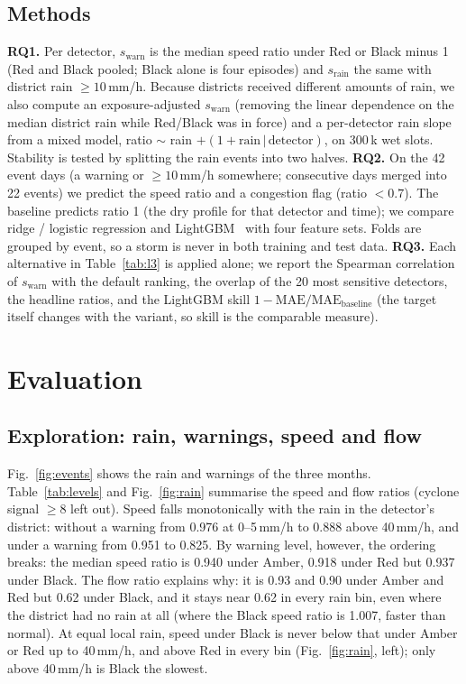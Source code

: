 \documentclass[conference]{IEEEtran}
\begin{document}
\subsection{Methods}
\textbf{RQ1.} Per detector, $s_{\mathrm{warn}}$ is the median speed ratio under Red or Black
minus 1 (Red and Black pooled; Black alone is four episodes) and $s_{\mathrm{rain}}$ the same
with district rain $\geq 10$\,mm/h. Because districts received different amounts of rain,
we also compute an exposure-adjusted $s_{\mathrm{warn}}$ (removing the linear dependence on
the median district rain while Red/Black was in force) and a per-detector rain slope from a
mixed model, ratio $\sim$ rain $+ (1+\mathrm{rain}\,|\,\mathrm{detector})$, on 300\,k wet
slots. Stability is tested by splitting the rain events into two halves.
\textbf{RQ2.} On the 42 event days (a warning or $\geq 10$\,mm/h somewhere; consecutive days
merged into 22 events) we predict the speed ratio and a congestion flag (ratio $<0.7$). The
baseline predicts ratio 1 (the dry profile for that detector and time); we compare ridge /
logistic regression and LightGBM~\cite{ke2017lightgbm} with four feature sets. Folds are
grouped by event, so a storm is never in both training and test data. \textbf{RQ3.} Each
alternative in Table~\ref{tab:l3} is applied alone; we report the Spearman correlation of
$s_{\mathrm{warn}}$ with the default ranking, the overlap of the 20 most sensitive detectors,
the headline ratios, and the LightGBM skill $1-\mathrm{MAE}/\mathrm{MAE}_{\mathrm{baseline}}$
(the target itself changes with the variant, so skill is the comparable measure).

\section{Evaluation}
\subsection{Exploration: rain, warnings, speed and flow}
Fig.~\ref{fig:events} shows the rain and warnings of the three months. Table~\ref{tab:levels}
and Fig.~\ref{fig:rain} summarise the speed and flow ratios (cyclone signal $\geq 8$ left
out). Speed falls monotonically with the rain in the detector's district: without a warning
from 0.976 at 0--5\,mm/h to 0.888 above 40\,mm/h, and under a warning from 0.951 to 0.825.
By warning level, however, the ordering breaks: the median speed ratio is 0.940 under Amber,
0.918 under Red but 0.937 under Black. The flow ratio explains why: it is 0.93 and 0.90 under
Amber and Red but 0.62 under Black, and it stays near 0.62 in every rain bin, even where the
district had no rain at all (where the Black speed ratio is 1.007, faster than normal).
At equal local rain, speed under Black is never below that under Amber or Red up to
40\,mm/h, and above Red in every bin (Fig.~\ref{fig:rain}, left); only above 40\,mm/h is
Black the slowest.
\end{document}
